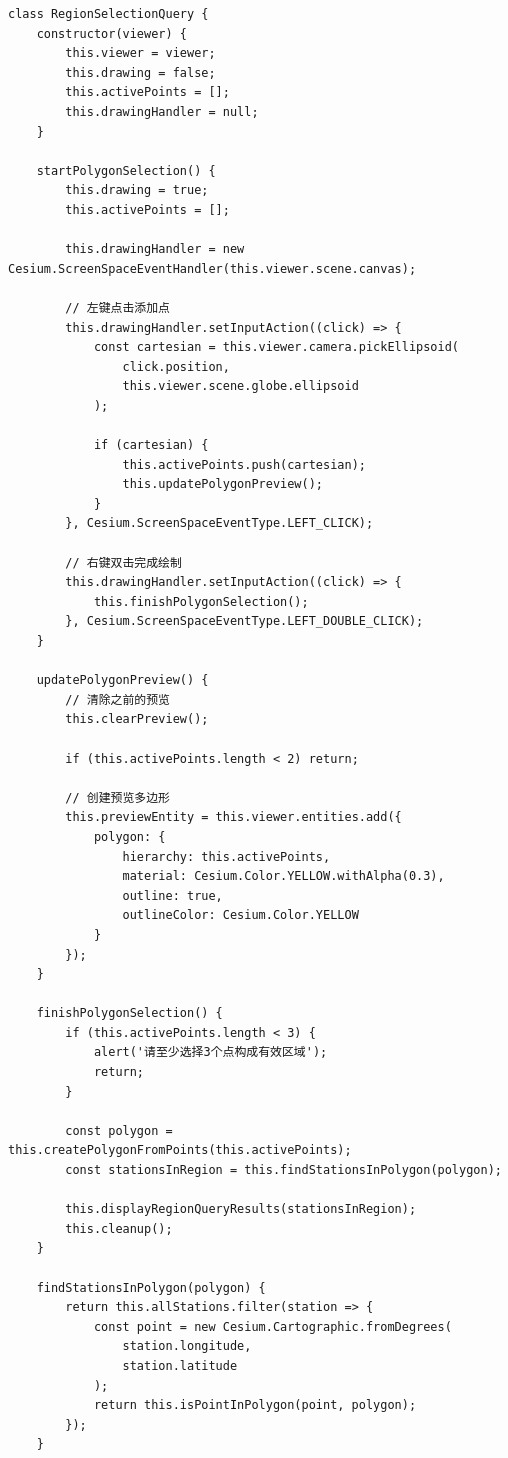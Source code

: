\begin{lstlisting}
class RegionSelectionQuery {
    constructor(viewer) {
        this.viewer = viewer;
        this.drawing = false;
        this.activePoints = [];
        this.drawingHandler = null;
    }
    
    startPolygonSelection() {
        this.drawing = true;
        this.activePoints = [];
        
        this.drawingHandler = new Cesium.ScreenSpaceEventHandler(this.viewer.scene.canvas);
        
        // 左键点击添加点
        this.drawingHandler.setInputAction((click) => {
            const cartesian = this.viewer.camera.pickEllipsoid(
                click.position,
                this.viewer.scene.globe.ellipsoid
            );
            
            if (cartesian) {
                this.activePoints.push(cartesian);
                this.updatePolygonPreview();
            }
        }, Cesium.ScreenSpaceEventType.LEFT_CLICK);
        
        // 右键双击完成绘制
        this.drawingHandler.setInputAction((click) => {
            this.finishPolygonSelection();
        }, Cesium.ScreenSpaceEventType.LEFT_DOUBLE_CLICK);
    }
    
    updatePolygonPreview() {
        // 清除之前的预览
        this.clearPreview();
        
        if (this.activePoints.length < 2) return;
        
        // 创建预览多边形
        this.previewEntity = this.viewer.entities.add({
            polygon: {
                hierarchy: this.activePoints,
                material: Cesium.Color.YELLOW.withAlpha(0.3),
                outline: true,
                outlineColor: Cesium.Color.YELLOW
            }
        });
    }
    
    finishPolygonSelection() {
        if (this.activePoints.length < 3) {
            alert('请至少选择3个点构成有效区域');
            return;
        }
        
        const polygon = this.createPolygonFromPoints(this.activePoints);
        const stationsInRegion = this.findStationsInPolygon(polygon);
        
        this.displayRegionQueryResults(stationsInRegion);
        this.cleanup();
    }
    
    findStationsInPolygon(polygon) {
        return this.allStations.filter(station => {
            const point = new Cesium.Cartographic.fromDegrees(
                station.longitude,
                station.latitude
            );
            return this.isPointInPolygon(point, polygon);
        });
    }
    

\end{lstlisting}
